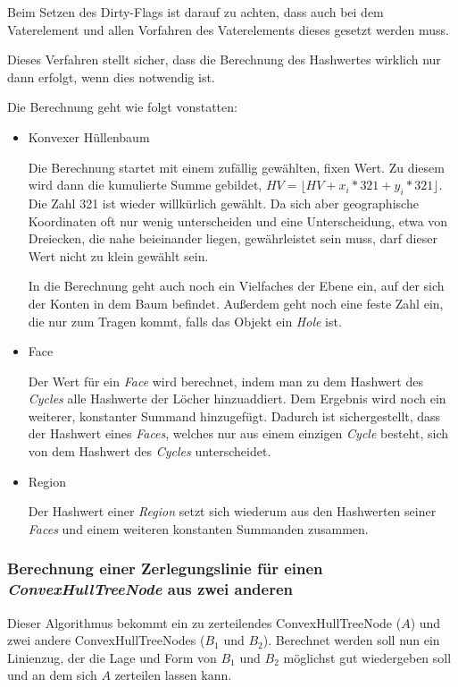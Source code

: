 Beim Setzen des Dirty-Flags ist darauf zu achten, dass auch bei dem Vaterelement und allen Vorfahren des Vaterelements dieses gesetzt werden muss.

Dieses Verfahren stellt sicher, dass die Berechnung des Hashwertes wirklich nur dann erfolgt, wenn dies notwendig ist.

Die Berechnung geht wie folgt vonstatten:

\begin{itemize}
\item Konvexer Hüllenbaum

Die Berechnung startet mit einem zufällig  gewählten, fixen Wert. Zu diesem wird dann die kumulierte Summe gebildet, $HV=\lfloor HV+x_i*321+y_i*321\rfloor$. Die Zahl 321 ist wieder willkürlich gewählt. Da sich aber geographische Koordinaten oft nur wenig unterscheiden und eine Unterscheidung, etwa von Dreiecken, die nahe beieinander liegen, gewährleistet sein muss, darf dieser Wert nicht zu klein gewählt sein. 

In die Berechnung geht auch noch ein Vielfaches der Ebene ein, auf der sich der Konten in dem Baum  befindet. Außerdem geht noch eine feste Zahl ein, die nur zum Tragen kommt, falls das Objekt ein \textit{Hole} ist.

\item Face

Der Wert für ein \textit{Face} wird berechnet, indem man zu dem Hashwert des \textit{Cycles} alle Hashwerte der Löcher hinzuaddiert. Dem Ergebnis wird noch ein weiterer, konstanter Summand hinzugefügt. Dadurch ist sichergestellt, dass der Hashwert eines \textit{Faces}, welches nur aus einem einzigen \textit{Cycle} besteht, sich von dem Hashwert des \textit{Cycles} unterscheidet.

\item Region

Der Hashwert einer \textit{Region} setzt sich wiederum aus den Hashwerten seiner \textit{Faces} und einem weiteren konstanten Summanden zusammen.
\end{itemize}

\subsubsection{Berechnung einer Zerlegungslinie für einen \textit{ConvexHullTreeNode} aus zwei anderen}\label{ZerteilungsAlgo}

Dieser Algorithmus bekommt ein zu zerteilendes ConvexHullTreeNode ($A$) und zwei andere ConvexHullTreeNodes ($B_1$ und $B_2$). Berechnet werden soll nun ein Linienzug, der die Lage und Form von $B_1$ und $B_2$ möglichst gut wiedergeben soll und an dem sich $A$ zerteilen lassen kann.

